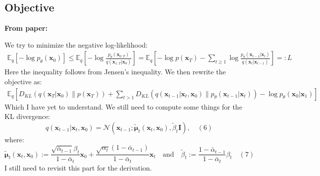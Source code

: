 \documentclass[12pt,a4paper]{article}
\begin{document}
\subsection{Objective}
\begin{center}
    \large\textbf{From paper:}
\end{center}
We try to minimize the negative log-likelihood:
\begin{align*}
    \mathbb{E}_{q} [-\log p_{\theta}(\mathbf{x}_0)] \leq \mathbb{E}_{q} \left[ -\log \frac{p_{\theta}(\mathbf{x}_{0:T})}{q(\mathbf{x}_{1:T}|\mathbf{x}_0)} \right] = \mathbb{E}_{q} \left[ -\log p(\mathbf{x}_T) - \sum_{t \geq 1} \log \frac{p_{\theta}(\mathbf{x}_{t-1}|\mathbf{x}_t)}{q(\mathbf{x}_t|\mathbf{x}_{t-1})} \right] =: L \quad 
\end{align*}
Here the inequality follows from Jensen's inequality.
We then rewrite the objective as:
\begin{align}
    \mathbb{E}_q \left[ D_{KL}(q(\mathbf{x}_T|\mathbf{x}_0) \| p(\mathbf{x}_T)) + \sum_{t > 1} D_{KL}(q(\mathbf{x}_{t-1}|\mathbf{x}_t, \mathbf{x}_0) \| p_{\theta}(\mathbf{x}_{t-1}|\mathbf{x}_t)) - \log p_{\theta}(\mathbf{x}_0|\mathbf{x}_1) \right]
\end{align}
Which I have yet to understand.
We still need to compute some things for the KL divergence:
\begin{equation*}
    q(\mathbf{x}_{t-1}|\mathbf{x}_t, \mathbf{x}_0) = \mathcal{N}(\mathbf{x}_{t-1}; \tilde{\boldsymbol{\mu}}_t(\mathbf{x}_t, \mathbf{x}_0), \tilde{\beta}_t \mathbf{I}), \quad (6)
\end{equation*}
where:
\begin{equation*}
    \tilde{\boldsymbol{\mu}}_t(\mathbf{x}_t, \mathbf{x}_0) := \frac{\sqrt{\bar{\alpha}_{t-1}}\beta_t}{1 - \bar{\alpha}_t} \mathbf{x}_0 + \frac{\sqrt{\alpha_t}(1 - \bar{\alpha}_{t-1})}{1 - \bar{\alpha}_t} \mathbf{x}_t \quad \text{and} \quad \tilde{\beta}_t := \frac{1 - \bar{\alpha}_{t-1}}{1 - \bar{\alpha}_t} \beta_t \quad (7)
\end{equation*}
I still need to revisit this part for the derivation.
\end{document}
